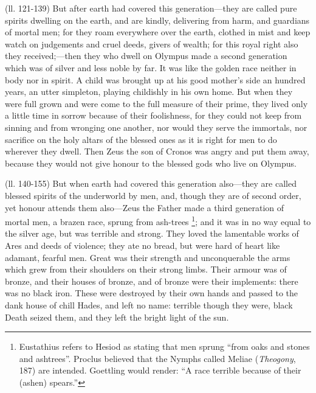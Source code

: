 (ll. 121-139) But after earth had covered this generation—they are called
pure spirits dwelling on the earth, and are kindly, delivering from harm, and
guardians of mortal men; for they roam everywhere over the earth, clothed in
mist and keep watch on judgements and cruel deeds, givers of wealth; for this
royal right also they received;—then they who dwell on Olympus made a
second generation which was of silver and less noble by far. It was like the
golden race neither in body nor in spirit. A child was brought up at his good
mother’s side an hundred years, an utter simpleton, playing childishly in
his own home. But when they were full grown and were come to the full measure
of their prime, they lived only a little time in sorrow because of their
foolishness, for they could not keep from sinning and from wronging one
another, nor would they serve the immortals, nor sacrifice on the holy altars
of the blessed ones as it is right for men to do wherever they dwell. Then Zeus
the son of Cronos was angry and put them away, because they would not give
honour to the blessed gods who live on Olympus.

(ll. 140-155) But when earth had covered this generation also—they are
called blessed spirits of the underworld by men, and, though they are of second
order, yet honour attends them also—Zeus the Father made a third
generation of mortal men, a brazen race, sprung from ash-trees \footnote{Eustathius refers to
Hesiod as stating that men sprung “from oaks and stones and
ashtrees”. Proclus believed that the Nymphs called Meliae
(\emph{Theogony}, 187) are intended. Goettling would render: “A race
terrible because of their (ashen) spears.”}; and it was in no way equal to
the silver age, but was terrible and strong. They loved the lamentable works of
Ares and deeds of violence; they ate no bread, but were hard of heart like
adamant, fearful men. Great was their strength and unconquerable the arms which
grew from their shoulders on their strong limbs. Their armour was of bronze,
and their houses of bronze, and of bronze were their implements: there was no
black iron. These were destroyed by their own hands and passed to the dank
house of chill Hades, and left no name: terrible though they were, black Death
seized them, and they left the bright light of the sun.


